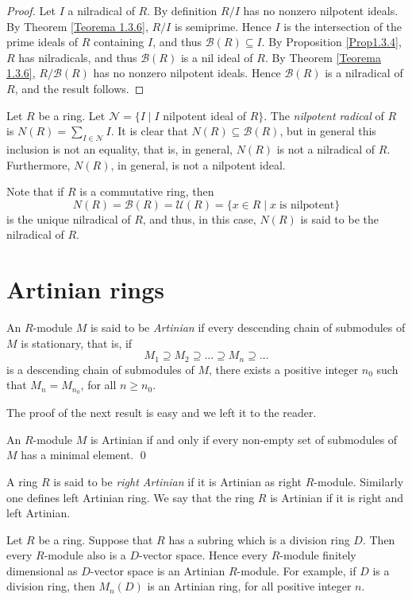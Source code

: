 \begin{proof}
Let $I$ a nilradical of $R$. By definition $R/I$ has no nonzero nilpotent ideals. By Theorem \ref{Teorema 1.3.6}, $R/I$ is semiprime. Hence
$I$  is the intersection of the prime ideals of $R$ containing $I$, and thus $\mathcal{B}(R)\subseteq I$. By Proposition \ref{Prop1.3.4}, $R$ has nilradicals, and thus $\mathcal{B}(R)$ is a nil ideal of $R$. By Theorem \ref{Teorema 1.3.6}, $R/\mathcal{B}(R)$ has no nonzero nilpotent ideals. Hence $\mathcal{B}(R)$ is a nilradical of $R$, and the result follows.
\end{proof}

Let $R$ be a ring. Let $\mathcal{N}=\{ I\mid I$ nilpotent ideal of $R\}$. The {\em nilpotent radical} of $R$ is
$N(R)=\sum_{I\in\mathcal{N}} I$. It is clear that $N(R)\subseteq \mathcal{B}(R)$, but in general this inclusion is not an equality, 
that is, in general, $N(R)$ is not a nilradical of $R$. Furthermore,
$N(R)$, in general, is not a nilpotent ideal.

Note that if $R$ is a commutative ring, then
$$N(R)=\mathcal{B}(R)=\mathcal{U}(R)=\{ x\in R\mid x\;\mbox{is nilpotent}\}$$
is the unique nilradical of $R$, and thus, in this case,  $N(R)$ is said to be the nilradical of $R$.

\section*{Artinian rings}
An $R$-module $M$ is said to be {\em Artinian} if every descending chain of submodules of $M$ is stationary, that is, if
$$M_1\supseteq M_2\supseteq\dots\supseteq M_n\supseteq\dots$$
is a descending chain of submodules of $M$, there exists a positive integer $n_0$ such that $M_n=M_{n_0}$, for all $n\geq n_0$.

The proof of the next result is easy and we left it to the reader.

\begin{proposition}\label{Prop1.4.1}
An $R$-module $M$ is Artinian if and only if every non-empty set of submodules of $M$ has a minimal element. \qed
\end{proposition}

A ring $R$ is said to be {\em right Artinian} if it is Artinian as right $R$-module.
Similarly one defines left Artinian ring. We say that the ring $R$ is Artinian if it is right and left Artinian.

\begin{example}
Let $R$ be a ring. Suppose that $R$ has a subring which is a division ring $D$. Then every $R$-module also is a $D$-vector space. Hence every $R$-module finitely dimensional as $D$-vector space
is an Artinian $R$-module.
For example, if $D$ is a division ring, then $M_n(D)$ is an Artinian ring, for all positive integer $n$.
\end{example}


